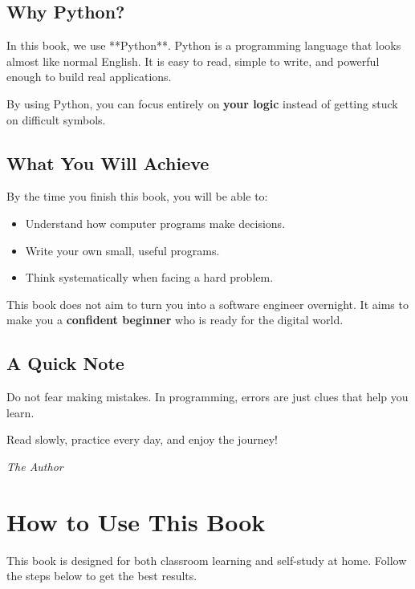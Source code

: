 \section*{Why Python?}

In this book, we use **Python**. Python is a programming language that looks almost like normal English. It is easy to read, simple to write, and powerful enough to build real applications.

By using Python, you can focus entirely on \textbf{your logic} instead of getting stuck on difficult symbols.

\section*{What You Will Achieve}

By the time you finish this book, you will be able to:
\begin{itemize}
    \item Understand how computer programs make decisions.
    \item Write your own small, useful programs.
    \item Think systematically when facing a hard problem.
\end{itemize}

This book does not aim to turn you into a software engineer overnight. It aims to make you a \textbf{confident beginner} who is ready for the digital world.

\section*{A Quick Note}

Do not fear making mistakes. In programming, errors are just clues that help you learn.

Read slowly, practice every day, and enjoy the journey!

\vfill
\begin{flushright}
\textit{The Author}
\end{flushright}

\newpage

\chapter*{How to Use This Book}

This book is designed for both classroom learning and self-study at home. Follow the steps below to get the best results.

